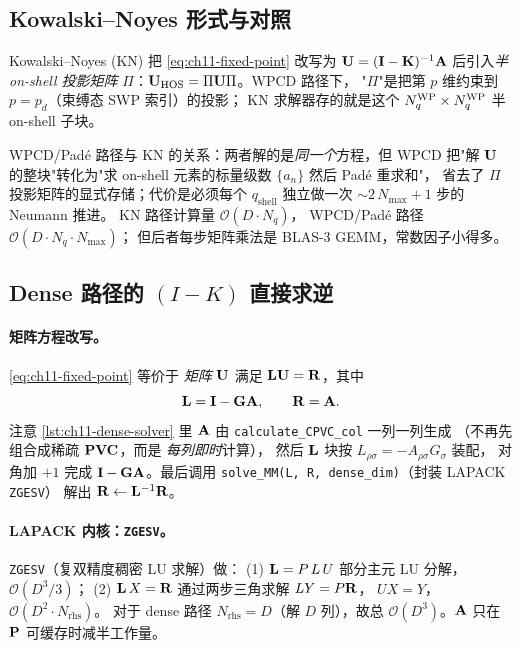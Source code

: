 \subsection{Kowalski--Noyes 形式与对照}
\label{subsec:ch11-kn-form}

Kowalski--Noyes (KN) 把 \cref{eq:ch11-fixed-point} 改写为
\(\mathbf{U} = (\mathbf{I} - \mathbf{K})^{-1}\mathbf{A}\) 后引入\emph{半 on-shell 投影矩阵}
\(\Pi\)：\(\mathbf{U}_{\text{HOS}} = \Pi\mathbf{U}\Pi\)。WPCD 路径下，
"\(\Pi\)"是把第 \(p\) 维约束到 \(p=p_d\)（束缚态 SWP 索引）的投影；
KN 求解器存的就是这个 \({N_{q}^{\text{WP}}} \times {N_{q}^{\text{WP}}}\) 半 on-shell 子块。

WPCD/Padé 路径与 KN 的关系：两者解的是\emph{同一个}方程，但
WPCD 把"解 \(\mathbf{U}\) 的整块"转化为"求 on-shell 元素的标量级数 \(\{a_n\}\) 然后 Padé 重求和"，
省去了 \(\Pi\) 投影矩阵的显式存储；代价是必须每个 \(q_{\text{shell}}\)
独立做一次 \(\sim 2\,N_{\max}+1\) 步的 Neumann 推进。
KN 路径计算量 \(\mathcal{O}(D \cdot N_{q})\)，
WPCD/Padé 路径 \(\mathcal{O}(D \cdot N_{q} \cdot N_{\max})\)；
但后者每步矩阵乘法是 BLAS-3 GEMM，常数因子小得多。

\subsection{Dense 路径的 \texorpdfstring{$(I-K)$}{(I-K)} 直接求逆}
\label{subsec:ch11-dense-derivation}

\paragraph{矩阵方程改写。}
\cref{eq:ch11-fixed-point} 等价于 \emph{矩阵} \(\mathbf{U}\) 满足
\(\mathbf{L}\mathbf{U} = \mathbf{R}\)，其中
\begin{equation}
\label{eq:ch11-LU-RHS}
\mathbf{L} = \mathbf{I} - \mathbf{G}\mathbf{A}, \qquad \mathbf{R} = \mathbf{A}.
\end{equation}
注意 \cref{lst:ch11-dense-solver} 里 \(\mathbf{A}\) 由 \texttt{calculate\_CPVC\_col} 一列一列生成
（不再先组合成稀疏 \(\mathbf{P}\mathbf{V}\mathbf{C}\)，而是 \emph{每列即时}计算），
然后 \(\mathbf{L}\) 块按 \(L_{\rho \sigma} = -A_{\rho \sigma} G_\sigma\) 装配，
对角加 \(+1\) 完成 \(\mathbf{I} - \mathbf{G}\mathbf{A}\)。最后调用
\texttt{solve\_MM(L, R, dense\_dim)}（封装 LAPACK \texttt{ZGESV}）
解出 \(\mathbf{R} \leftarrow \mathbf{L}^{-1}\mathbf{R}\)。

\paragraph{LAPACK 内核：\texttt{ZGESV}。}
\texttt{ZGESV}（复双精度稠密 LU 求解）做：
(1) \(\mathbf{L} = P\,L\,U\) 部分主元 LU 分解，\(\mathcal{O}(D^3/3)\)；
(2) \(\mathbf{L}\,X = \mathbf{R}\) 通过两步三角求解 \(L Y = P\mathbf{R}\)，
\(U X = Y\)，\(\mathcal{O}(D^2 \cdot N_{\text{rhs}})\)。
对于 dense 路径 \(N_{\text{rhs}} = D\)（解 \(D\) 列），故总
\(\mathcal{O}(D^3)\)。\(\mathbf{A}\) 只在 \(\mathbf{P}\) 可缓存时减半工作量。

